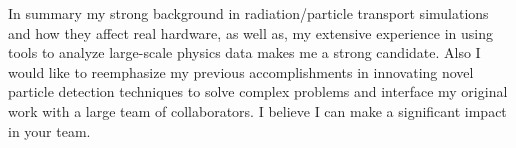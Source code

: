 \documentclass[11pt]{article} %
\begin{document}
In summary my strong background in radiation/particle transport simulations and
how they affect real hardware, as well as, my extensive experience in using
tools to analyze large-scale physics data makes me a strong candidate. Also I
would like to reemphasize my previous accomplishments in innovating novel
particle detection techniques to solve complex problems and interface my
original work with a large team of collaborators. I believe I can make a
significant impact in your team.

%
%
%
\end{document}
